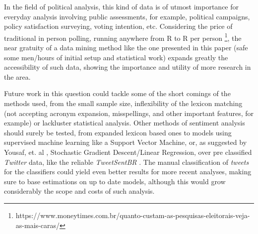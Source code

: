 \documentclass[conference]{IEEEtran}
\begin{document}
In the field of political analysis, this kind of data is of utmost importance for everyday analysis involving public assessments, for example, political campaigns, policy satisfaction surveying, voting intention, etc. Considering the price of traditional in person polling, running anywhere from R to R per person \footnote{https://www.moneytimes.com.br/quanto-custam-as-pesquisas-eleitorais-veja-as-mais-caras/}, the near gratuity of a data mining method like the one presented in this paper (safe some men/hours of initial setup and statistical work) expands greatly the accessibility of such data, showing the importance and utility of more research in the area.

Future work in this question could tackle some of the short comings of the methods used, from the small sample size, inflexibility of the lexicon matching (not accepting acronym expansion, misspellings, and other important features, for example) or lackluster statistical analysis. Other methods of sentiment analysis should surely be tested, from expanded lexicon based ones to models using supervised machine learning like a Support Vector Machine, or, as suggested by Yousaf, et. al \cite{Yousaf2021}, Stochastic Gradient Descent/Linear Regression, over pre classified \emph{Twitter} data, like the reliable \emph{TweetSentBR} \cite{Brum2017}. The manual classification of \emph{tweets} for the classifiers could yield even better results for more recent analyses, making sure to base estimations on up to date models, although this would grow considerably the scope and costs of such analysis.

\printbibliography{}
\end{document}
